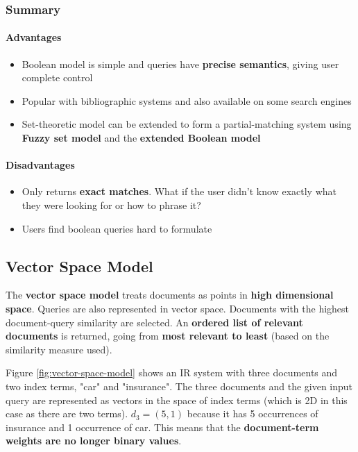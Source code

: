 \documentclass{article}
\begin{document}
\subsubsection{Summary}

\paragraph{\textbf{Advantages}}
\begin{itemize}
	\item Boolean model is simple and queries have \textbf{precise semantics}, giving user complete control
	\item Popular with bibliographic systems and also available on some search engines
	\item Set-theoretic model can be extended to form a partial-matching system using \textbf{Fuzzy set model} and the \textbf{extended Boolean model}
\end{itemize}
\paragraph{\textbf{Disadvantages}}
\begin{itemize}
	\item Only returns \textbf{exact matches}. What if the user didn't know exactly what they were looking for or how to phrase it?
	\item Users find boolean queries hard to formulate
\end{itemize}

\subsection{Vector Space Model}

The \textbf{vector space model} treats documents as points in \textbf{high dimensional space}. Queries are also represented in vector space. Documents with the highest document-query similarity are selected. An \textbf{ordered list of relevant documents} is returned, going from \textbf{most relevant to least} (based on the similarity measure used).

Figure \ref{fig:vector-space-model} shows an IR system with three documents and two index terms, "car" and "insurance". The three documents and the given input query are represented as vectors in the space of index terms (which is 2D in this case as there are two terms). $d_3 = (5, 1)$ because it has 5 occurrences of insurance and 1 occurrence of car. This means that the \textbf{document-term weights are no longer binary values}.
\end{document}
